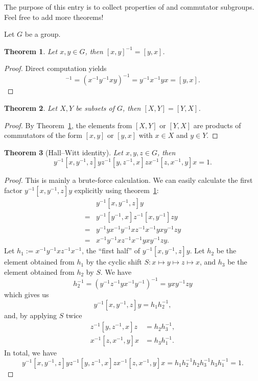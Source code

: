 \documentclass[12pt]{article}
\newcommand{\<}{\langle}
\renewcommand{\>}{\rangle}
\begin{document}
\newtheorem{thm}{Theorem}
The purpose of this entry is to collect properties of  and commutator subgroups. Feel free to add more theorems!

Let $G$ be a group.

\begin{thm}
\label{thm:inversecommutator}
Let $x,y\in G$, then $[x,y]^{-1}=[y,x]$.
\end{thm}
\begin{proof}
Direct computation yields
\begin{equation*}
[x,y]^{-1}=(x^{-1}y^{-1}xy)^{-1}=y^{-1}x^{-1}yx=[y,x].
\end{equation*}
\end{proof}

\begin{thm}
Let $X,Y$ be subsets of $G$, then $[X,Y]=[Y,X]$.
\end{thm}
\begin{proof}
By Theorem~\ref{thm:inversecommutator}, the elements from $[X,Y]$ or
$[Y,X]$ are products of commutators of the form $[x,y]$ or $[y,x]$
with $x\in X$ and $y\in Y$.
\end{proof}

\begin{thm}[Hall--Witt identity]
Let $x,y,z\in G$, then
\begin{equation*}
y^{-1}[x,y^{-1},z]yz^{-1}[y,z^{-1},x]zx^{-1}[z,x^{-1},y]x=1.
\end{equation*}
\end{thm}
\begin{proof}
This is mainly a brute-force calculation. We can easily calculate the
first factor $y^{-1}[x,y^{-1},z]y$ explicitly using
theorem~\ref{thm:inversecommutator}:
\begin{align*}
&y^{-1}[x,y^{-1},z]y\\
=&y^{-1}[y^{-1},x]z^{-1}[x,y^{-1}]zy\\
=&y^{-1}yx^{-1}y^{-1}xz^{-1}x^{-1}yxy^{-1}zy\\
=&x^{-1}y^{-1}xz^{-1}x^{-1}yxy^{-1}zy.
\end{align*}
Let $h_1:=x^{-1}y^{-1}xz^{-1}x^{-1}$, the ``first half'' of
$y^{-1}[x,y^{-1},z]y$. Let $h_2$ be the element obtained from $h_1$ by
the cyclic shift $S\colon x\mapsto y\mapsto z\mapsto x$, and $h_3$ be
the element obtained from $h_2$ by $S$. We have
\begin{equation*}
h_2^{-1}=(y^{-1}z^{-1}yx^{-1}y^{-1})^{-1}=yxy^{-1}zy
\end{equation*}
which gives us
\begin{equation*}
y^{-1}[x,y^{-1},z]y=h_1h_2^{-1},
\end{equation*}
and, by applying $S$ twice
\begin{align*}
z^{-1}[y,z^{-1},x]z&=h_2h_3^{-1},\\
x^{-1}[z,x^{-1},y]x&=h_3h_1^{-1}.
\end{align*}
In total, we have
\begin{equation*}
y^{-1}[x,y^{-1},z]yz^{-1}[y,z^{-1},x]zx^{-1}[z,x^{-1},y]x=h_1h_2^{-1}h_2h_3^{-1}h_3h_1^{-1}=1.
\end{equation*}
\end{proof}
\end{document}
